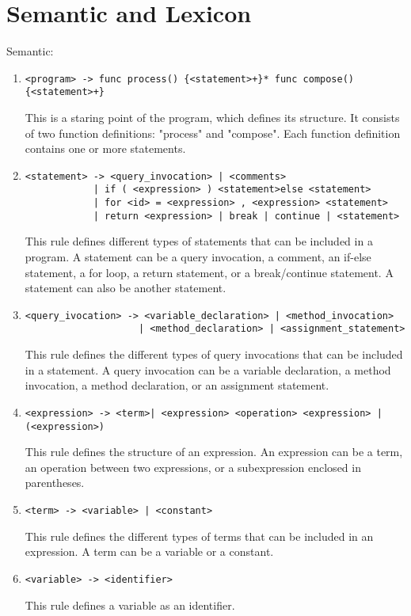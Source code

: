 \section{Semantic and Lexicon}

Semantic: 
\begin{enumerate}
\item 
\begin{verbatim}
<program> -> func process() {<statement>+}* func compose() {<statement>+}
\end{verbatim}
This is a staring point of the program, which defines its structure. It consists of two function definitions: "process" and "compose". Each function definition contains one or more statements.
\item 
\begin{verbatim}
<statement> -> <query_invocation> | <comments> 
            | if ( <expression> ) <statement>else <statement> 
            | for <id> = <expression> , <expression> <statement> 
            | return <expression> | break | continue | <statement>
\end{verbatim}
This rule defines different types of statements that can be included in a program. A statement can be a query invocation, a comment, an if-else statement, a for loop, a return statement, or a break/continue statement. A statement can also be another statement.
\item 
\begin{verbatim}
<query_ivocation> -> <variable_declaration> | <method_invocation> 
                    | <method_declaration> | <assignment_statement>
\end{verbatim}
This rule defines the different types of query invocations that can be included in a statement. A query invocation can be a variable declaration, a method invocation, a method declaration, or an assignment statement.
\item 
\begin{verbatim}
<expression> -> <term>| <expression> <operation> <expression> | (<expression>)
\end{verbatim}
This rule defines the structure of an expression. An expression can be a term, an operation between two expressions, or a subexpression enclosed in parentheses.
\item 
\begin{verbatim}
<term> -> <variable> | <constant>
\end{verbatim}
This rule defines the different types of terms that can be included in an expression. A term can be a variable or a constant.
\item 
\begin{verbatim}
<variable> -> <identifier>
\end{verbatim}

This rule defines a variable as an identifier.
\end{enumerate}

